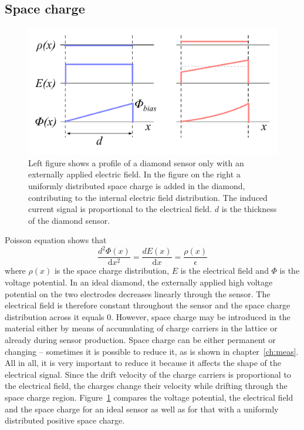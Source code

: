 \subsection{Space charge}
\begin{figure}[!t]
\begin{center}
\includegraphics[width=0.6\linewidth]{02_pulse_formation/pics/plots/spcchg}
\caption{Left figure shows a profile of a diamond sensor only with an externally applied electric field. In the figure on the right a uniformly distributed space charge is added in the diamond, contributing to  the internal electric field distribution. The induced current signal is proportional to the electrical field. $d$ is the thickness of the diamond sensor.}
\label{fig:spcchg}
\end{center}
\end{figure}
Poisson equation shows that 
\begin{equation}
\label{eq:poisson}
\frac{d^2\Phi(x)}{\mathrm{d}x^2} = \frac{dE(x)}{\mathrm{d}x} = \frac{\rho(x)}{\epsilon}
\end{equation}
where $\rho(x)$ is the space charge distribution, $E$ is the electrical field and $\Phi$ is the voltage potential. In an ideal diamond, the externally applied high voltage potential on the two electrodes decreases linearly through the sensor. The electrical field is therefore constant throughout the sensor and the space charge distribution across it equals 0. However, space charge may be introduced in the material either by means of accumulating of charge carriers in the lattice or already during sensor production. Space charge can be either permanent or changing -- sometimes it is possible to reduce it, as is shown in chapter~\ref{ch:meas}. All in all, it is very important to reduce it because it affects the shape of the electrical signal. Since the drift velocity of the charge carriers is proportional to the electrical field, the charges change their velocity while drifting through the space charge region. Figure~\ref{fig:spcchg} compares the voltage potential, the electrical field and the space charge for an ideal sensor as well as for that with a uniformly distributed positive space charge.




